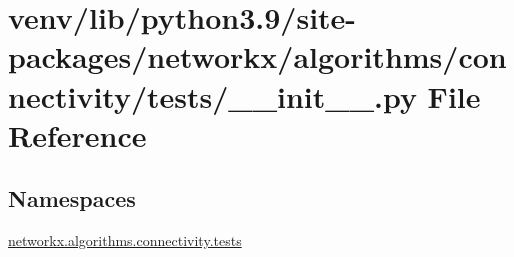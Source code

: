 \hypertarget{venv_2lib_2python3_89_2site-packages_2networkx_2algorithms_2connectivity_2tests_2____init_____8py}{}\section{venv/lib/python3.9/site-\/packages/networkx/algorithms/connectivity/tests/\+\_\+\+\_\+init\+\_\+\+\_\+.py File Reference}
\label{venv_2lib_2python3_89_2site-packages_2networkx_2algorithms_2connectivity_2tests_2____init_____8py}
\subsection*{Namespaces}
\begin{DoxyCompactItemize}
\item 
 \hyperlink{namespacenetworkx_1_1algorithms_1_1connectivity_1_1tests}{networkx.\+algorithms.\+connectivity.\+tests}
\end{DoxyCompactItemize}
